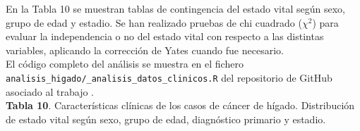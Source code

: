En la Tabla 10 se muestran tablas de contingencia del estado vital según sexo, grupo de edad y estadio. Se han realizado pruebas de chi cuadrado ($\chi^2$) \cite{Pearson1900} para evaluar la independencia o no del estado vital con respecto a las distintas variables, aplicando la corrección de Yates \cite{Yates1934} cuando fue necesario.\\

El código completo del análisis se muestra en el fichero \texttt{analisis\_higado/\_analisis\_datos\_clinicos.R} del repositorio de GitHub asociado al trabajo \cite{Redondo-Sanchez2020}.\\

\textbf{Tabla 10}. Características clínicas de los casos de cáncer de hígado. Distribución de  estado vital según sexo, grupo de edad, diagnóstico primario y estadio.

